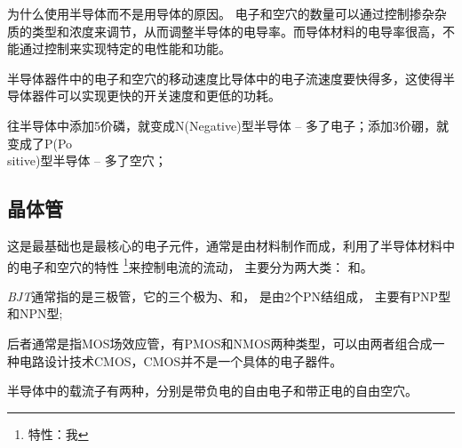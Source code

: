 \documentclass{template}
\begin{document}
            为什么使用半导体而不是用导体的原因。
            电子和空穴的数量可以通过控制掺杂杂质的类型和浓度来调节，从而调整半导体的电导率。而导体材料的电导率很高，不能通过控制来实现特定的电性能和功能。

            半导体器件中的电子和空穴的移动速度比导体中的电子流速度要快得多，这使得半导体器件可以实现更快的开关速度和更低的功耗。


            往半导体中添加5价磷，就变成N(Negative)型半导体 -- 多了电子；添加3价硼，就变成了P(Po\\sitive)型半导体 -- 多了空穴；


    \subsection{晶体管}
        这是最基础也是最核心的电子元件，通常是由材料制作而成，利用了半导体材料中的电子和空穴的特性
        \footnote{特性：我}来控制电流的流动，
        主要分为两大类：
        和。

        \textit{BJT}通常指的是三极管，它的三个极为、和，
        是由2个PN结组成，
        主要有PNP型和NPN型; 

        后者通常是指MOS场效应管，有PMOS和NMOS两种类型，可以由两者组合成一种电路设计技术CMOS，CMOS并不是一个具体的电子器件。

        半导体中的载流子有两种，分别是带负电的自由电子和带正电的自由空穴。
\end{document}
